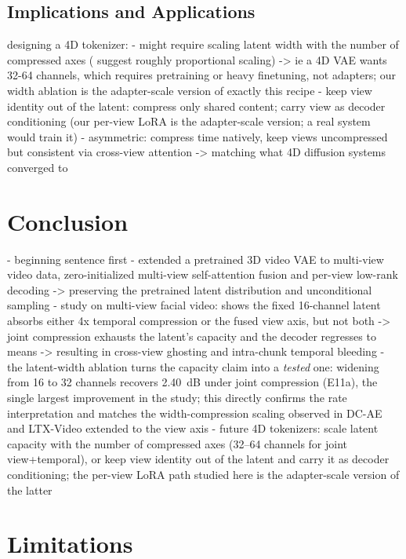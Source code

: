 \subsection{Implications and Applications}

designing a 4D tokenizer:
- might require scaling latent width with the number of compressed axes (\cite{chen2024deep, hacohen2024ltx} suggest roughly proportional scaling) -> ie a 4D VAE wants 32-64 channels, which requires pretraining or heavy finetuning, not adapters; our width ablation is the adapter-scale version of exactly this recipe
- keep view identity out of the latent: compress only shared content; carry view as decoder conditioning (our per-view LoRA is the adapter-scale version; a real system would train it)
- asymmetric: compress time natively, keep views uncompressed but consistent via cross-view attention -> matching what 4D diffusion systems converged to \cite{xie2024sv4d, shao2024human4dit}


\section{Conclusion}

- beginning sentence first
- extended a pretrained 3D video VAE to multi-view video data, zero-initialized multi-view self-attention fusion and per-view low-rank decoding -> preserving the pretrained latent distribution and unconditional sampling
- study on multi-view facial video: shows the fixed 16-channel latent absorbs either 4x temporal compression or the fused view axis, but not both -> joint compression exhausts the latent's capacity and the decoder regresses to means -> resulting in cross-view ghosting and intra-chunk temporal bleeding
- the latent-width ablation turns the capacity claim into a \emph{tested} one: widening from 16 to 32 channels recovers 2.40~dB under joint compression (E11a), the single largest improvement in the study; this directly confirms the rate interpretation and matches the width-compression scaling observed in DC-AE \cite{chen2024deep} and LTX-Video \cite{hacohen2024ltx} extended to the view axis
- future 4D tokenizers: scale latent capacity with the number of compressed axes (32--64 channels for joint view+temporal), or keep view identity out of the latent and carry it as decoder conditioning; the per-view LoRA path studied here is the adapter-scale version of the latter


\section{Limitations}

